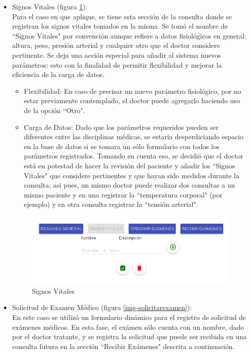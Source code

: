 \begin{itemize}
        \item Signos Vitales (figura \ref{img-signovital}):\\
        Para el caso en que aplique, se tiene esta sección de la consulta donde se registran los signos vitales tomados en la misma. Se tomó el nombre de ``Signos Vitales" por convención aunque refiere a datos fisiológicos en general: altura, peso, presión arterial y cualquier otro que el doctor considere pertinente. Se deja una acción especial para añadir al sistema nuevos parámetros; esto con la finalidad de permitir flexibilidad y mejorar la eficiencia de la carga de datos.
            \begin{itemize}
                \item Flexibilidad: En caso de precisar un nuevo parámetro fisiológico, por no estar previamente contemplado, el doctor puede agregarlo haciendo uso de la opción ``Otro".
                \item Carga de Datos: Dado que los parámetros requeridos pueden ser diferentes entre las disciplinas médicas, se estaría desperdiciando espacio en la base de datos si se tomara un sólo formulario con todos los parámetros registrados. Tomando en cuenta eso, se decidió que el doctor está en potestad de hacer la revisión del paciente y añadir los ``Signos Vitales" que considere pertinentes y que hayan sido medidos durante la consulta; así pues, un mismo doctor puede realizar dos consultas a un mismo paciente y en una registrar la ``temperatura corporal" (por ejemplo) y en otra consulta registrar la ``tensión arterial".
            \end{itemize}
            
            \begin{figure}[htb!]
                \begin{center}
                    \includegraphics[width=.75\textwidth,keepaspectratio=true]{figures/consulta2}
                \end{center}
                \caption{Signos Vitales}
                \label{img-signovital}
            \end{figure}
        \item Solicitud de Examen Médico (figura \ref{img-solicitarexamen}):\\
        En este caso se utilizó un formulario dinámico para el registro de solicitud de exámenes médicos. En esta fase, el exámen sólo cuenta con un nombre, dado por el doctor tratante, y se registra la solicitud que puede ser recibida en una consulta futura en la sección ``Recibir Exámenes" descrita a continuación.
        

\end{itemize}
